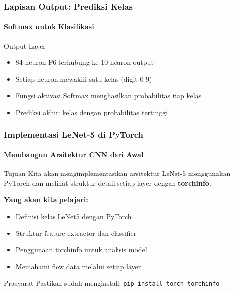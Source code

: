\documentclass[t,aspectratio=169,xcolor=dvipsnames]{beamer}
\begin{document}
\begin{frame}
    \frametitle{Lapisan Output: Prediksi Kelas}
    \framesubtitle{Softmax untuk Klasifikasi}
    \small
    \begin{block}{Output Layer}
        \begin{itemize}
            \item 84 neuron F6 terhubung ke 10 neuron output
            \item Setiap neuron mewakili satu kelas (digit 0-9)
            \item Fungsi aktivasi Softmax menghasilkan probabilitas tiap kelas
            \item Prediksi akhir: kelas dengan probabilitas tertinggi
        \end{itemize}
    \end{block}
\end{frame}

\begin{frame}
    \frametitle{Implementasi LeNet-5 di PyTorch}
    \framesubtitle{Membangun Arsitektur CNN dari Awal}
    \small

    \begin{block}{Tujuan}
        Kita akan mengimplementasikan arsitektur LeNet-5 menggunakan PyTorch dan melihat struktur detail setiap layer dengan \textbf{torchinfo}.
    \end{block}

    \textbf{Yang akan kita pelajari:}
    \begin{itemize}
        \item Definisi kelas LeNet5 dengan PyTorch
        \item Struktur feature extractor dan classifier
        \item Penggunaan torchinfo untuk analisis model
        \item Memahami flow data melalui setiap layer
    \end{itemize}

    \begin{alertblock}{Prasyarat}
        Pastikan sudah menginstall: \texttt{pip install torch torchinfo}
    \end{alertblock}

\end{frame}
\end{document}
